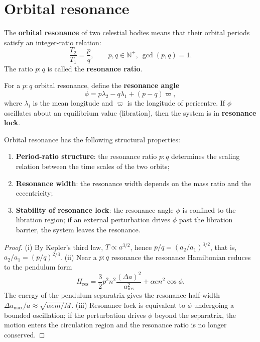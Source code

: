 \section{Orbital resonance}
\label{sec:astro_resonance}

\begin{definition}\label{def:orbital_resonance}
The \textbf{orbital resonance} of two celestial bodies means that their orbital periods satisfy an integer-ratio relation:
\[
\frac{T_2}{T_1}=\frac pq,\qquad p,q\in\mathbb N^+,\ \gcd(p,q)=1.
\]
The ratio \(p:q\) is called the \textbf{resonance ratio}.
\end{definition}

\begin{definition}\label{def:resonance_angle}
For a \(p:q\) orbital resonance, define the \textbf{resonance angle}
\[
\phi=p\lambda_2-q\lambda_1+(p-q)\varpi,
\]
where \(\lambda_i\) is the mean longitude and \(\varpi\) is the longitude of pericentre. If \(\phi\) oscillates about an equilibrium value (libration), then the system is in \textbf{resonance lock}.
\end{definition}

\begin{proposition}\label{prop:resonance_structure}
Orbital resonance has the following structural properties:
\begin{enumerate}[label=(\roman*)]
    \item \textbf{Period-ratio structure}: the resonance ratio \(p:q\) determines the scaling relation between the time scales of the two orbits;
    \item \textbf{Resonance width}: the resonance width depends on the mass ratio and the eccentricity;
    \item \textbf{Stability of resonance lock}: the resonance angle \(\phi\) is confined to the libration region; if an external perturbation drives \(\phi\) past the libration barrier, the system leaves the resonance.
\end{enumerate}
\end{proposition}

\begin{proof}
(i) By Kepler's third law, \(T\propto a^{3/2}\), hence \(p/q=(a_2/a_1)^{3/2}\), that is, \(a_2/a_1=(p/q)^{2/3}\).
(ii) Near a \(p:q\) resonance the resonance Hamiltonian reduces to the pendulum form
\[
H_{\text{res}}=\frac32p^2n^2\frac{(\Delta a)^2}{a_{\text{res}}^2}+\alpha e n^2\cos\phi.
\]
The energy of the pendulum separatrix gives the resonance half-width \(\Delta a_{\max}/a\approx\sqrt{\alpha e m/M}\).
(iii) Resonance lock is equivalent to \(\phi\) undergoing a bounded oscillation; if the perturbation drives \(\phi\) beyond the separatrix, the motion enters the circulation region and the resonance ratio is no longer conserved.
\end{proof}

